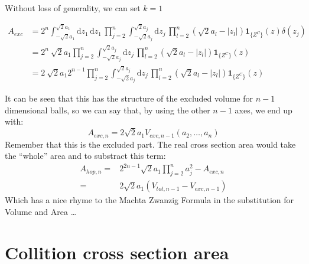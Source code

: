 \documentclass[superscriptaddress,pre,reprint,showpacs,onecolumn]{revtex4-1}
\newcommand{\rd}[1]{\mathrm{d}{#1} \,}
\newcommand{\indicatorsymbol}{\mathbf{1}}
\newcommand{\indicator}[1]{\indicatorsymbol_{ \{   #1 \} } }
\begin{document}
Without loss of generality, we can set $k=1$

\begin{equation}
  \begin{split}
    A_{exc} &=  2^n \int_{-\sqrt{2}a_1}^{\sqrt{2}a_1} \rd{z_1} \rd{z_1}
    \prod_{j=2}^n \int_{-\sqrt{2} a_j}^{\sqrt{2}a_j} \rd{z_j}
    \prod_{l=2}^n (\sqrt{2}a_l-|z_l|)
    \indicator{Z^C} (z)
    \delta (z_j) \\
    &= 2^n\ \sqrt{2}a_1    \prod_{j=2}^n \int_{-\sqrt{2} a_j}^{\sqrt{2}a_j} \rd{z_j}
    \prod_{l=2}^n (\sqrt{2}a_l-|z_l|)
    \indicator{Z^C} (z) \\
    &= 2\ \sqrt{2}a_1  2^{n-1}  \prod_{j=2}^n \int_{-\sqrt{2} a_j}^{\sqrt{2}a_j} \rd{z_j}
     \prod_{l=2}^n (\sqrt{2}a_l-|z_l|)
    \indicator{Z^C} (z) 
  \end{split}
\end{equation}

It can be seen that this has the structure of the excluded volume
for $n-1$ dimensional balls, so we can say that, by using the other
$n-1$ axes, we end up with:
\begin{equation}
  A_{exc,n}=2 \sqrt{2}a_1V_{exc,n-1}(a_2,\ldots,a_n)
\end{equation}
Remember that this is the excluded part. The real cross
section area would take
the ``whole'' area and to substract this term:
\begin{equation}
  \begin{split}
    A_{hop,n}  = & 2^{2n-1}\sqrt{2}a_1\prod_{j=2}^n a_j^2-A_{exc,n} \\
      = & 2 \sqrt{2}a_1 (V_{tot,n-1} - V_{exc,n-1})
  \end{split} 
\end{equation}
Which has a nice rhyme to the Machta Zwanzig Formula in the substitution
for Volume and Area \ldots

\section{Collition cross section area}
\end{document}
